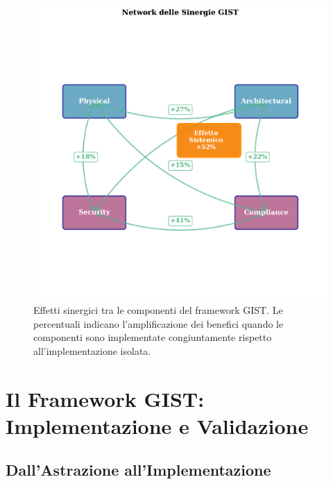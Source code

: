 \begin{figure}[htbp]
\centering
\includegraphics[width=1.1\textwidth]{thesis_figures/cap5/figura_5_2_synergies.pdf}


\caption[Effetti sinergici tra le componenti del framework GIST]{Effetti sinergici tra le componenti del framework GIST. Le percentuali indicano l'amplificazione dei benefici quando le componenti sono implementate congiuntamente rispetto all'implementazione isolata.}
\label{fig:synergies}
\end{figure}

\section{\texorpdfstring{Il Framework GIST: Implementazione e Validazione}{5.3 - Il Framework GIST: Implementazione e Validazione}}
\label{sec:5.3}

\subsection{\texorpdfstring{Dall'Astrazione all'Implementazione}{5.3.1 - Dall'Astrazione all'Implementazione}}


